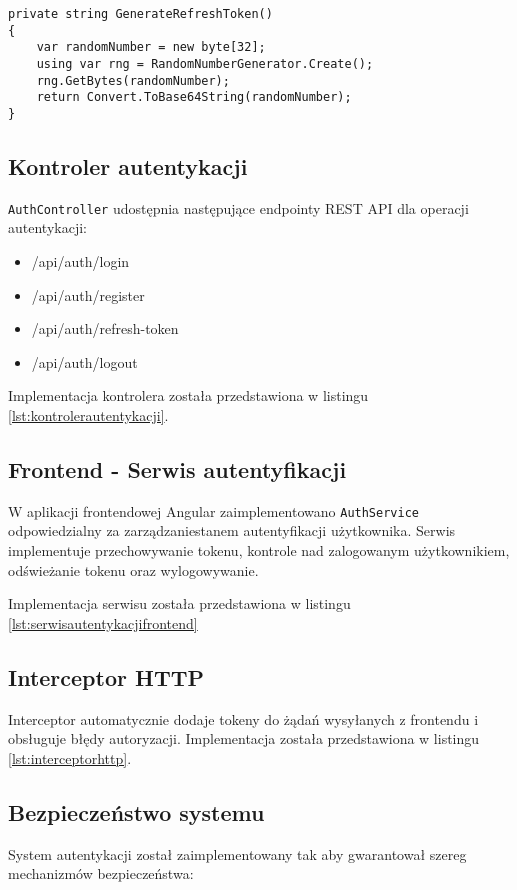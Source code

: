 \begin{lstlisting}[style=csharp, caption={Generowanie tokenu odświeżającego}]
private string GenerateRefreshToken()
{
	var randomNumber = new byte[32];
	using var rng = RandomNumberGenerator.Create();
	rng.GetBytes(randomNumber);
	return Convert.ToBase64String(randomNumber);
}
\end{lstlisting}

\subsection{Kontroler autentykacji}
\texttt{AuthController} udostępnia następujące endpointy REST API dla operacji autentykacji:
\begin{itemize}
	\item /api/auth/login
	\item /api/auth/register
	\item /api/auth/refresh-token
	\item /api/auth/logout
\end{itemize}

Implementacja kontrolera została przedstawiona w listingu \ref{lst:kontrolerautentykacji}.

\subsection{Frontend - Serwis autentyfikacji}
W aplikacji frontendowej Angular zaimplementowano \texttt{AuthService} odpowiedzialny za zarządzaniestanem autentyfikacji użytkownika.
Serwis implementuje przechowywanie tokenu, kontrole nad zalogowanym użytkownikiem, odświeżanie tokenu oraz wylogowywanie.

Implementacja serwisu została przedstawiona w listingu \ref{lst:serwisautentykacjifrontend}

\subsection{Interceptor HTTP}
Interceptor automatycznie dodaje tokeny do żądań wysyłanych z frontendu i obsługuje błędy autoryzacji.
Implementacja została przedstawiona w listingu \ref{lst:interceptorhttp}.


\subsection{Bezpieczeństwo systemu}
System autentykacji został zaimplementowany tak aby gwarantował szereg mechanizmów bezpieczeństwa:

